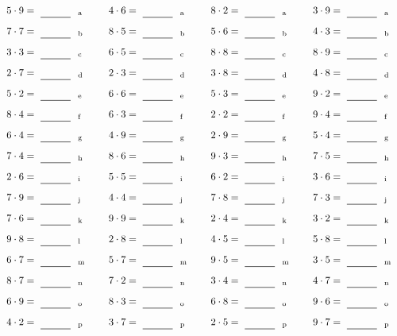 \documentclass
[
  draft    = true,
  fontsize = 11pt,
  parskip  = half-
]
{scrartcl}
\begin{document}
\par\vfill\par
\begin{align*}
    \pline{5\cdot9}&=\rline{a}
  & \pline{4\cdot6}&=\rline{a}
  & \pline{8\cdot2}&=\rline{a}
  & \pline{3\cdot9}&=\rline{a} \\[1ex]
    \pline{7\cdot7}&=\rline{b}
  & \pline{8\cdot5}&=\rline{b}
  & \pline{5\cdot6}&=\rline{b}
  & \pline{4\cdot3}&=\rline{b} \\[1ex]
    \pline{3\cdot3}&=\rline{c}
  & \pline{6\cdot5}&=\rline{c}
  & \pline{8\cdot8}&=\rline{c}
  & \pline{8\cdot9}&=\rline{c} \\[1ex]
    \pline{2\cdot7}&=\rline{d}
  & \pline{2\cdot3}&=\rline{d}
  & \pline{3\cdot8}&=\rline{d}
  & \pline{4\cdot8}&=\rline{d} \\[1ex]
    \pline{5\cdot2}&=\rline{e}
  & \pline{6\cdot6}&=\rline{e}
  & \pline{5\cdot3}&=\rline{e}
  & \pline{9\cdot2}&=\rline{e} \\[1ex]
    \pline{8\cdot4}&=\rline{f}
  & \pline{6\cdot3}&=\rline{f}
  & \pline{2\cdot2}&=\rline{f}
  & \pline{9\cdot4}&=\rline{f} \\[1ex]
    \pline{6\cdot4}&=\rline{g}
  & \pline{4\cdot9}&=\rline{g}
  & \pline{2\cdot9}&=\rline{g}
  & \pline{5\cdot4}&=\rline{g} \\[1ex]
    \pline{7\cdot4}&=\rline{h}
  & \pline{8\cdot6}&=\rline{h}
  & \pline{9\cdot3}&=\rline{h}
  & \pline{7\cdot5}&=\rline{h} \\[1ex]
    \pline{2\cdot6}&=\rline{i}
  & \pline{5\cdot5}&=\rline{i}
  & \pline{6\cdot2}&=\rline{i}
  & \pline{3\cdot6}&=\rline{i} \\[1ex]
    \pline{7\cdot9}&=\rline{j}
  & \pline{4\cdot4}&=\rline{j}
  & \pline{7\cdot8}&=\rline{j}
  & \pline{7\cdot3}&=\rline{j} \\[1ex]
    \pline{7\cdot6}&=\rline{k}
  & \pline{9\cdot9}&=\rline{k}
  & \pline{2\cdot4}&=\rline{k}
  & \pline{3\cdot2}&=\rline{k} \\[1ex]
    \pline{9\cdot8}&=\rline{l}
  & \pline{2\cdot8}&=\rline{l}
  & \pline{4\cdot5}&=\rline{l}
  & \pline{5\cdot8}&=\rline{l} \\[1ex]
    \pline{6\cdot7}&=\rline{m}
  & \pline{5\cdot7}&=\rline{m}
  & \pline{9\cdot5}&=\rline{m}
  & \pline{3\cdot5}&=\rline{m} \\[1ex]
    \pline{8\cdot7}&=\rline{n}
  & \pline{7\cdot2}&=\rline{n}
  & \pline{3\cdot4}&=\rline{n}
  & \pline{4\cdot7}&=\rline{n} \\[1ex]
    \pline{6\cdot9}&=\rline{o}
  & \pline{8\cdot3}&=\rline{o}
  & \pline{6\cdot8}&=\rline{o}
  & \pline{9\cdot6}&=\rline{o} \\[1ex]
    \pline{4\cdot2}&=\rline{p}
  & \pline{3\cdot7}&=\rline{p}
  & \pline{2\cdot5}&=\rline{p}
  & \pline{9\cdot7}&=\rline{p}
\end{align*}
\end{document}

